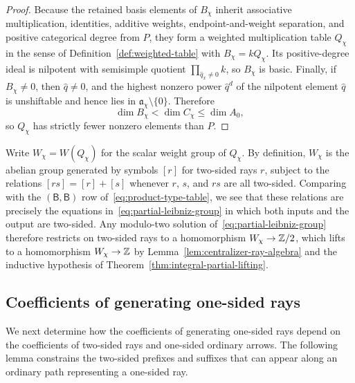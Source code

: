 \begin{proof}
Because the retained basis elements of $B_\chi$ inherit associative multiplication, identities, additive weights, endpoint-and-weight separation, and positive categorical degree from $P$, they form a weighted multiplication table $Q_\chi$ in the sense of Definition~\ref{def:weighted-table} with $B_\chi=kQ_\chi$. Its positive-degree ideal is nilpotent with semisimple quotient $\prod_{\widehat q_x\ne0}k$, so $B_\chi$ is basic. Finally, if $B_\chi\ne0$, then $\widehat q\ne0$, and the highest nonzero power $\widehat q^d$ of the nilpotent element $\widehat q$ is unshiftable and hence lies in $\mathfrak a_\chi\setminus\{0\}$. Therefore
\[
  \dim B_\chi<\dim C_\chi\leq\dim A_0,
\]
so $Q_\chi$ has strictly fewer nonzero elements than $P$.
\end{proof}

Write $W_\chi=W(Q_\chi)$ for the scalar weight group of $Q_\chi$. By definition, $W_\chi$ is the abelian group generated by symbols $[r]$ for two-sided rays $r$, subject to the relations $[rs]=[r]+[s]$ whenever $r$, $s$, and $rs$ are all two-sided. Comparing with the $(\mathsf B,\mathsf B)$ row of~\eqref{eq:product-type-table}, we see that these relations are precisely the equations in~\eqref{eq:partial-leibniz-group} in which both inputs and the output are two-sided. Any modulo-two solution of~\eqref{eq:partial-leibniz-group} therefore restricts on two-sided rays to a homomorphism $W_\chi\to\mathbb Z/2$, which lifts to a homomorphism $W_\chi\to\mathbb Z$ by Lemma~\ref{lem:centralizer-ray-algebra} and the inductive hypothesis of Theorem~\ref{thm:integral-partial-lifting}.

\subsection{Coefficients of generating one-sided rays}

We next determine how the coefficients of generating one-sided rays depend on the coefficients of two-sided rays and one-sided ordinary arrows. The following lemma constrains the two-sided prefixes and suffixes that can appear along an ordinary path representing a one-sided ray.

